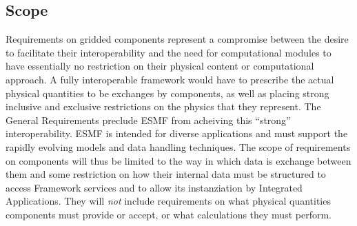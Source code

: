 \subsection{Scope}



Requirements on gridded components represent a compromise between
the desire to facilitate their interoperability and the need for
computational modules to have essentially no restriction on their
physical content or computational approach.
A fully interoperable framework would
have to prescribe the actual physical quantities to be exchanges
by components, as well as placing strong inclusive and exclusive 
restrictions on the physics that they represent. The General Requirements
 preclude ESMF from acheiving this  ``strong'' interoperability.
ESMF is intended for  diverse
applications and must support  the rapidly  evolving 
models and data handling techniques.
The scope of requirements on components will thus be limited to the
way in which data is exchange between them and some restriction
on how their internal data must be structured to access Framework
services and to allow its instanziation by Integrated Applications.
They will {\em not} include requirements on what physical quantities
components must provide or accept, or what calculations they
must perform.

















